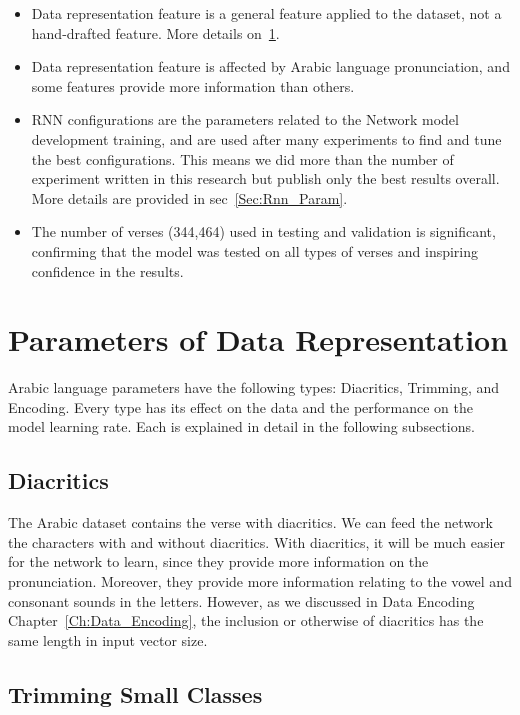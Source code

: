 \begin{itemize}
 \item Data representation feature is a general feature applied to the dataset, not a hand-drafted feature. More details on~\ref{Sec:Data_Rep_Param}.
 \item Data representation feature is affected by Arabic language pronunciation, and some features provide more information than others.
 \item RNN configurations are the parameters related to the Network model development training, and are used after many experiments to find and tune the best configurations. This means we did more than the number of experiment written in this research but publish only the best results overall. More details are provided in sec~\ref{Sec:Rnn_Param}.
 \item The number of verses (344,464) used in testing and validation is significant, confirming that the model was tested on all types of verses and inspiring confidence in the results.

\end{itemize}

\section{Parameters of Data Representation}\label{Sec:Data_Rep_Param}

Arabic language parameters have the following types: Diacritics, Trimming, and Encoding. Every type has its effect on the data and the performance on the model learning rate. Each is explained in detail in the following subsections.

\subsection{Diacritics}

The Arabic dataset contains the verse with diacritics. We can feed the network the characters with and without diacritics. With diacritics, it will be much easier for the network to learn, since they provide more information on the pronunciation. Moreover, they provide more information relating to the vowel and consonant sounds in the letters. However, as we discussed in Data Encoding Chapter~\ref{Ch:Data_Encoding}, the inclusion or otherwise of diacritics has the same length in input vector size.


\subsection{Trimming Small Classes}

